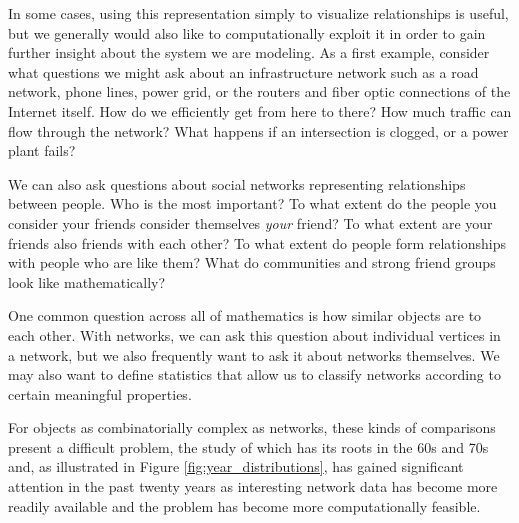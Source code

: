 \documentclass[12pt]{thesis}
\theoremstyle{plain}
\theoremstyle{definition}
\theoremstyle{remark}
\begin{document}
 In some cases, using this representation simply to visualize relationships is useful, but we generally would also like to computationally exploit it in order to gain further insight about the system we are modeling. As a first example, consider what questions we might ask about an infrastructure network such as a road network, phone lines, power grid, or the routers and fiber optic connections of the Internet itself. How do we efficiently get from here to there? How much traffic can flow through the network? What happens if an intersection is clogged, or a power plant fails? 

We can also ask questions about social networks representing relationships between people. Who is the most important? To what extent do the people you consider your friends consider themselves \textit{your} friend?  To what extent are your friends also friends with each other? To what extent do people form relationships with people who are like them? What do communities and strong friend groups look like mathematically?

One common question across all of mathematics is how similar objects are to each other. With networks, we can ask this question about individual vertices in a network, but we also frequently want to ask it about networks themselves. We may also want to define statistics that allow us to classify networks according to certain meaningful properties.


For objects as combinatorially complex as networks, these kinds of comparisons present a difficult problem, the study of which has its roots in the 60s and 70s \cite{Conte_2004} and, as illustrated in Figure \ref{fig:year_distributions}, has gained significant attention in the past twenty years as interesting network data has become more readily available and the problem has become more computationally feasible.
\end{document}
